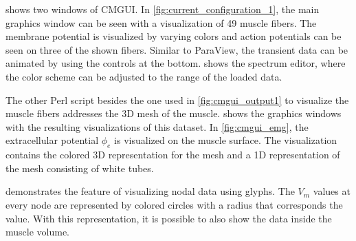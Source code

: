  shows two windows of CMGUI. In \cref{fig:current_configuration_1}, the main graphics window can be seen with a visualization of 49 muscle fibers. The membrane potential is visualized by varying colors and action potentials can be seen on three of the shown fibers. Similar to ParaView, the transient data can be animated by using the controls at the bottom.
 shows the spectrum editor, where the color scheme can be adjusted to the range of the loaded data.

The other Perl script besides the one used in \cref{fig:cmgui_output1} to visualize the muscle fibers addresses the 3D mesh of the muscle.
 shows the graphics windows with the resulting visualizations of this dataset. In \cref{fig:cmgui_emg}, the extracellular potential $\phi_e$ is visualized on the muscle surface. The visualization contains the colored 3D representation for the mesh and a 1D representation of the mesh consisting of white tubes.

 demonstrates the feature of visualizing nodal data using glyphs. The $V_m$ values at every node are represented by colored circles with a radius that corresponds the value. With this representation, it is possible to also show the data inside the muscle volume.

